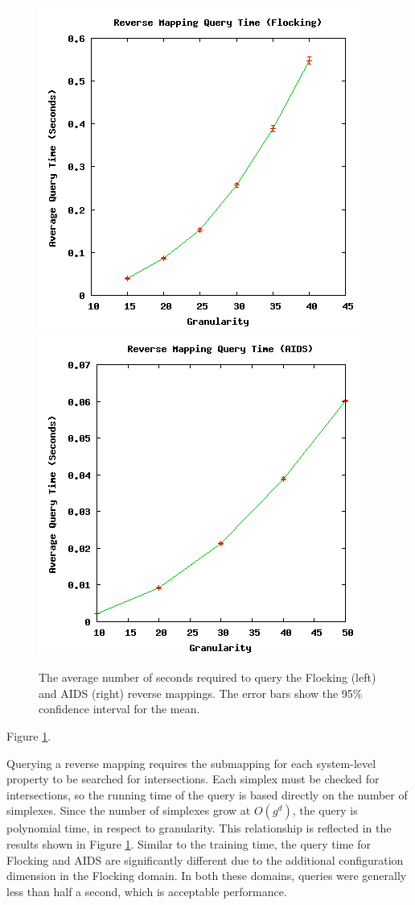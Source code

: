 \begin{figure}[ht]
\centering
\includegraphics[scale=.5]{images/results_flocking/rmquery.png}
\includegraphics[scale=.5]{images/results_aids/aids-rmquery.png}
\caption{The average number of seconds required to query the Flocking (left) and AIDS (right) reverse mappings.
The error bars show the 95\% confidence interval for the mean.}
\label{fig:farmquery}
\end{figure}

Figure \ref{fig:farmquery}.

Querying a reverse mapping requires the submapping for each system-level property to be searched for intersections.
Each simplex must be checked for intersections, so the running time of the query is based directly on the number of simplexes.
Since the number of simplexes grow at $O(g^d)$, the query is polynomial time, in respect to granularity.
This relationship is reflected in the results shown in Figure \ref{fig:farmquery}.
Similar to the training time, the query time for Flocking and AIDS are significantly different due to the additional configuration dimension in the Flocking domain.
In both these domains, queries were generally less than half a second, which is acceptable performance.



